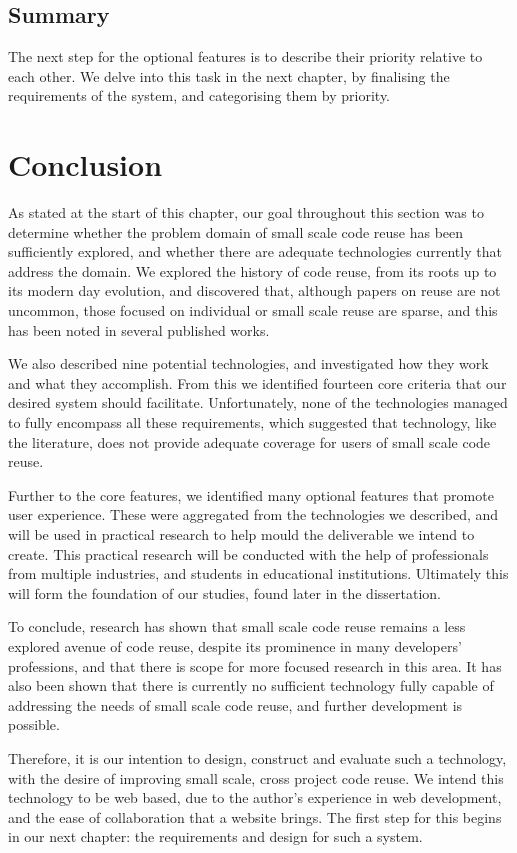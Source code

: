 \subsection{Summary}

The next step for the optional features is to describe their priority relative to each other.
We delve into this task in the next chapter, by finalising the requirements of the system, and categorising them by priority.

\section{Conclusion} \label{littechconclusion}
As stated at the start of this chapter, our goal throughout this section was to determine whether the problem domain of small scale code reuse has been sufficiently explored, and whether there are adequate technologies currently that address the domain.
We explored the history of code reuse, from its roots up to its modern day evolution, and discovered that, although papers on reuse are not uncommon, those focused on individual or small scale reuse are sparse, and this has been noted in several published works.

We also described nine potential technologies, and investigated how they work and what they accomplish.
From this we identified fourteen core criteria that our desired system should facilitate.
Unfortunately, none of the technologies managed to fully encompass all these requirements, which suggested that technology, like the literature, does not provide adequate coverage for users of small scale code reuse. 

Further to the core features, we identified many optional features that promote user experience.
These were aggregated from the technologies we described, and will be used in practical research to help mould the deliverable we intend to create.
This practical research will be conducted with the help of professionals from multiple industries, and students in educational institutions.
Ultimately this will form the foundation of our studies, found later in the dissertation.

To conclude, research has shown that small scale code reuse remains a less explored avenue of code reuse, despite its prominence in many developers' professions, and that there is scope for more focused research in this area.
It has also been shown that there is currently no sufficient technology fully capable of addressing the needs of  small scale code reuse, and further development is possible.

Therefore, it is our intention to design, construct and evaluate such a technology, with the desire of improving small scale, cross project code reuse.
We intend this technology to be web based, due to the author's experience in web development, and the ease of collaboration that a website brings.
The first step for this begins in our next chapter: the requirements and design for such a system.

